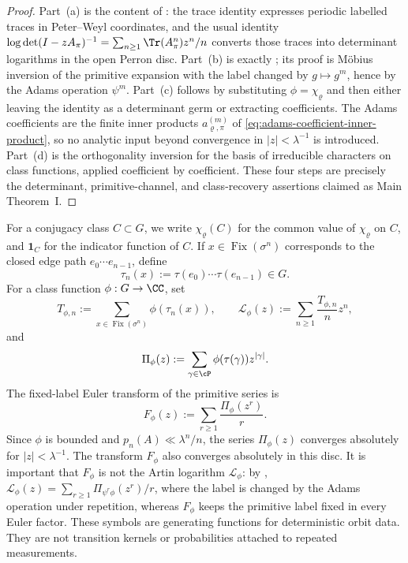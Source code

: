 \begin{proof}
  Part~(a) is the content of
  : the
  trace identity expresses periodic labelled traces in Peter--Weyl
  coordinates, and the usual identity
  \(\log\det(I-zA_\pi)^{-1}=\sum_{n\ge1}\Tr(A_\pi^n)z^n/n\) converts those
  traces into determinant logarithms in the open Perron disc. Part~(b) is
  exactly ; its proof is M\"obius
  inversion of the primitive expansion with the label changed by
  \(g\mapsto g^m\), hence by the Adams operation \(\psi^m\). Part~(c)
  follows by substituting \(\phi=\chi_\varrho\) and then either leaving the
  identity as a determinant germ or extracting coefficients. The Adams
  coefficients are the finite inner products
  \(a_{\varrho,\pi}^{(m)}\) of
  \eqref{eq:adams-coefficient-inner-product}, so no analytic input beyond
  convergence in \(|z|<\lambda^{-1}\) is introduced. Part~(d) is the
  orthogonality inversion for the basis of irreducible characters on class
  functions, applied coefficient by coefficient. These four steps are
  precisely the determinant, primitive-channel, and class-recovery assertions
  claimed as Main Theorem~I.
\end{proof}

For a conjugacy class \(C\subset G\), we write \(\chi_\varrho(C)\) for
the common value of \(\chi_\varrho\) on \(C\), and \(\mathbf 1_C\) for
the indicator function of \(C\). If \(x\in\operatorname{Fix}(\sigma^n)\)
corresponds to the closed edge path \(e_0\cdots e_{n-1}\), define
\[
  \tau_n(x):=\tau(e_0)\cdots\tau(e_{n-1})\in G.
\]
For a class function \(\phi:G\to\CC\), set
\begin{equation}\label{eq:class-logarithm-def}
  T_{\phi,n}:=\sum_{x\in\operatorname{Fix}(\sigma^n)}\phi(\tau_n(x)),
  \qquad
  \mathcal L_\phi(z):=\sum_{n\ge 1}\frac{T_{\phi,n}}{n}z^n,
\end{equation}
and
\begin{equation}\label{eq:primitive-class-series-def}
  \Pi_\phi(z):=\sum_{\gamma\in\cP}\phi(\tau(\gamma))z^{|\gamma|}.
\end{equation}
The fixed-label Euler transform of the primitive series is
\begin{equation}\label{eq:fixed-label-euler-transform-def}
  F_\phi(z):=\sum_{r\ge1}\frac{\Pi_\phi(z^r)}{r}.
\end{equation}
Since \(\phi\) is bounded and \(p_n(A)\ll \lambda^n/n\), the series
\(\Pi_\phi(z)\) converges absolutely for \(|z|<\lambda^{-1}\).
The transform \(F_\phi\) also converges absolutely in this disc. It is
important that \(F_\phi\) is not the Artin logarithm
\(\mathcal L_\phi\): by ,
\(\mathcal L_\phi(z)=\sum_{r\ge1}\Pi_{\psi^r\phi}(z^r)/r\), where the
label is changed by the Adams operation under repetition, whereas
\(F_\phi\) keeps the primitive label fixed in every Euler factor.
These symbols are generating functions for deterministic orbit data.
They are not transition kernels or probabilities attached to repeated
measurements.

